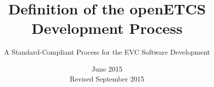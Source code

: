 \documentclass{template/openetcs_article}
\begin{document}
\frontmatter
{}



\newcommand{\nl}{\mbox{}\\}

\newcommand{\nthng}[1]{}

\newcommand{\oldtext}[1]{\textbf{OLD:} {\em #1} \textbf{DLO}}

\newcommand{\cmmnt}[1]{\fbox{#1}}

\newcommand{\bgcmmnt}[1]{\nl\framebox{\parbox{.95\textwidth}{#1}}\nl[2mm]}

\newcommand{\qq}[1]{?`#1?}

\newcommand{\tbd}{\cmmnt{tbd}}






\title{Definition of the openETCS Development Process}

\subtitle{A Standard-Compliant Process for the EVC Software Development}

\date{June 2015\\
Revised September 2015}



\end{document}
